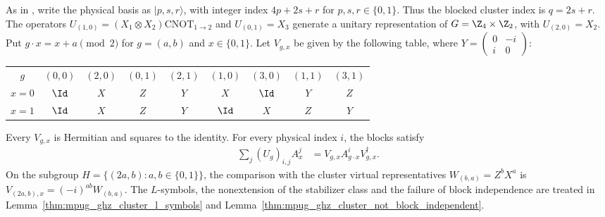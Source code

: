 \begin{lemma}
    \label{thm:mpug_ghz_cluster_action_table}
    \leanok
    As in \cite[lines~4481--4489]{FrancoRubio2025MPUGauging}, write the
    physical basis as $|p,s,r\rangle$, with integer index $4p+2s+r$ for
    $p,s,r\in\{0,1\}$. Thus the blocked cluster index is $q=2s+r$. The
    operators
    $U_{(1,0)}=(X_1\otimes X_2)\mathrm{CNOT}_{1\to2}$ and
    $U_{(0,1)}=X_3$ generate a unitary representation of
    $G=\Z_4\times\Z_2$, with $U_{(2,0)}=X_2$.
    Put $g\cdot x=x+a\pmod 2$ for $g=(a,b)$ and $x\in\{0,1\}$.
    Let $V_{g,x}$ be given by the following table, where
    $Y=\left(\begin{smallmatrix}0&-i\\i&0\end{smallmatrix}\right)$:
    \begin{center}
        \begin{tabular}{ccccccccc}
            $g$   & $(0,0)$ & $(2,0)$ & $(0,1)$ & $(2,1)$
                  & $(1,0)$ & $(3,0)$ & $(1,1)$ & $(3,1)$                             \\
            $x=0$ & $\Id$   & $X$     & $Z$     & $Y$     & $X$   & $\Id$ & $Y$ & $Z$ \\
            $x=1$ & $\Id$   & $X$     & $Z$     & $Y$     & $\Id$ & $X$   & $Z$ & $Y$ \\
        \end{tabular}
    \end{center}
    Every $V_{g,x}$ is Hermitian and squares to the identity. For every
    physical index $i$, the blocks satisfy
    \begin{align}
        \sum_j (U_g)_{i,j} A_x^j
         & =V_{g,x}A_{g\cdot x}^iV_{g,x}^{\dagger}.
        \label{eq:mpug_ghz_cluster_block_covariance}
    \end{align}
    On the subgroup $H=\{(2a,b):a,b\in\{0,1\}\}$, the comparison with the
    cluster virtual representatives $W_{(b,a)}=Z^bX^a$ is
    $V_{(2a,b),x}=(-i)^{ab}W_{(b,a)}$.
    The $L$-symbols, the nonextension of the stabilizer class and the failure
    of block independence are treated in
    Lemma~\ref{thm:mpug_ghz_cluster_l_symbols} and
    Lemma~\ref{thm:mpug_ghz_cluster_not_block_independent}.
\end{lemma}

